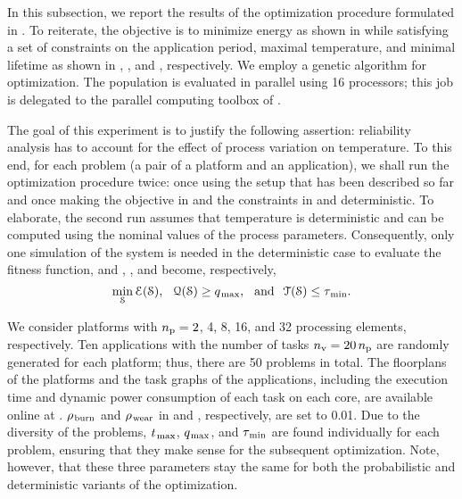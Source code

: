 In this subsection, we report the results of the optimization procedure formulated in .
To reiterate, the objective is to minimize energy as shown in  while satisfying a set of constraints on the application period, maximal temperature, and minimal lifetime as shown in , , and , respectively.
We employ a genetic algorithm for optimization.
The population is evaluated in parallel using 16 processors; this job is delegated to the parallel computing toolbox of  \cite{matlab}.

The goal of this experiment is to justify the following assertion: reliability analysis has to account for the effect of process variation on temperature.
To this end, for each problem (a pair of a platform and an application), we shall run the optimization procedure twice: once using the setup that has been described so far and once making the objective in  and the constraints in  and  deterministic.
To elaborate, the second run assumes that temperature is deterministic and can be computed using the nominal values of the process parameters.
Consequently, only one simulation of the system is needed in the deterministic case to evaluate the fitness function, and , , and  become, respectively,
\[
  \min_{\EuScript{S}} \EuScript{E}(\EuScript{S}), \hspace{0.7em} \EuScript{Q}(\EuScript{S}) \geq q_{\text{\kern0.1emmax}}, \hspace{0.7em} \text{and} \hspace{0.7em} \EuScript{T}(\EuScript{S}) \leq \tau_{\text{\kern0.1emmin}}.
\]


We consider platforms with ${n_\text{p}} = 2$, 4, 8, 16, and 32 processing elements, respectively.
Ten applications with the number of tasks ${n_\text{v}} = 20 \, {n_\text{p}}$ are randomly generated for each platform; thus, there are 50 problems in total.
The floorplans of the platforms and the task graphs of the applications, including the execution time and dynamic power consumption of each task on each core, are available online at \cite{sources}.
$\rho_{\text{\kern0.1emburn}}$ and $\rho_{\text{\kern0.1emwear}}$ in  and , respectively, are set to 0.01.
Due to the diversity of the problems, $t_{\text{\kern0.1emmax}}$, $q_{\text{\kern0.1emmax}}$, and $\tau_{\text{\kern0.1emmin}}$ are found individually for each problem, ensuring that they make sense for the subsequent optimization.
Note, however, that these three parameters stay the same for both the probabilistic and deterministic variants of the optimization.

